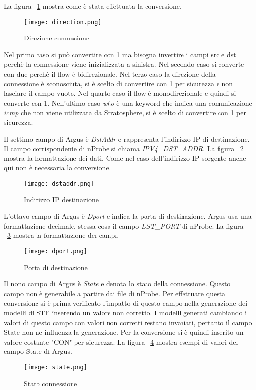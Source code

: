 \documentclass[../main.tex]{subfiles}
\begin{document}
La figura ~\ref{fig:direction} mostra come è stata effettuata la conversione.
\begin{figure}[H]
				\centering
\texttt{[image: direction.png]}
				\caption{Direzione connessione}
				\label{fig:direction}
\end{figure}
Nel primo caso si può convertire con 1 ma bisogna invertire i campi src e dst perchè la connessione viene inizializzata a sinistra. Nel secondo caso si converte con due perchè il flow è bidirezionale. Nel terzo caso la direzione della connessione è sconosciuta, si è scelto di convertire con 1 per sicurezza e non lasciare il campo vuoto. Nel quarto caso il flow è monodirezionale e quindi si converte con 1. Nell'ultimo caso \textit{who} è una keyword che indica una comunicazione \textit{icmp} che non viene utilizzata da Stratosphere, si è scelto di convertire con 1 per sicurezza.

Il settimo campo di Argus è \textit{DstAddr} e rappresenta l'indirizzo IP di destinazione. Il campo corrispondente di nProbe si chiama \textit{IPV4\_DST\_ADDR}. La figura ~\ref{fig:dstaddr} mostra la formattazione dei dati. Come nel caso dell'indirizzo IP sorgente anche qui non è necessaria la conversione.
\begin{figure}[H]
				\centering
\texttt{[image: dstaddr.png]}
				\caption{Indirizzo IP destinazione}
				\label{fig:dstaddr}
\end{figure}

L'ottavo campo di Argus è \textit{Dport} e indica la porta di destinazione. Argus usa una formattazione decimale, stessa cosa il campo \textit{DST\_PORT} di nProbe. La figura ~\ref{fig:dport} mostra la formattazione dei campi. 
\begin{figure}[H]
				\centering
\texttt{[image: dport.png]}
				\caption{Porta di destinazione}
				\label{fig:dport}
\end{figure}

Il nono campo di Argus è \textit{State} e denota lo stato della connessione. Questo campo non è generabile a partire dai file di nProbe. Per effettuare questa conversione si è prima verificato l'impatto di questo campo nella generazione dei modelli di STF inserendo un valore non corretto. I modelli generati cambiando i valori di questo campo con valori non corretti restano invariati, pertanto il campo State non ne influenza la generazione. Per la conversione si è quindi inserito un valore costante "CON" per sicurezza. La figura ~\ref{fig:state} mostra esempi di valori del campo State di Argus.
\begin{figure}[H]
				\centering
\texttt{[image: state.png]}
				\caption{Stato connessione}
				\label{fig:state}
\end{figure}
\end{document}
